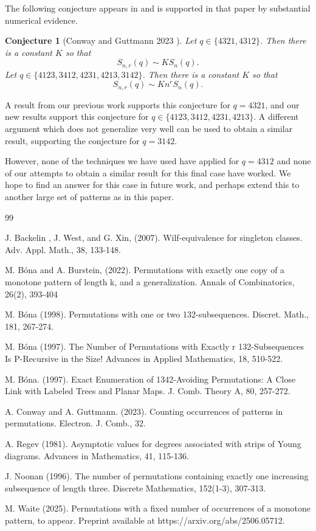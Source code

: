 \documentclass[11pt, final]{amsart}
\newtheorem{conjecture}[theorem]{Conjecture}
\theoremstyle{remark}
\numberwithin{equation}{section}
\begin{document}
The following conjecture appears in \cite{Conway} and is supported in that paper by substantial numerical evidence.

\begin{conjecture}[Conway and Guttmann 2023 \cite{Conway}]
     Let $q\in \{4321, 4312\}$. Then there is a constant $K$ so that
     \[
     S_{n,r}(q) \sim KS_{n}(q).
     \]
     Let $q\in \{4123, 3412, 4231, 4213, 3142\}$. Then there is a constant $K$ so that
     \[
     S_{n,r}(q) \sim Kn^rS_{n}(q).
     \]
\end{conjecture}

A result from our previous work \cite{Waite2025} supports this conjecture for $q = 4321$, and our new results support this conjecture for $q \in \{4123, 3412, 4231, 4213 \}$. A different argument which does not generalize very well can be used to obtain a similar result, supporting the conjecture for $q = 3142$. 

However, none of the techniques we have used have applied for $q = 4312$ and none of our attempts to obtain a similar result for this final case have worked. We hope to find an answer for this case in  future work, and perhaps extend this to another large set of patterns as in this paper.

\begin{thebibliography}{99}

 J. Backelin , J. West, and G. Xin, (2007). Wilf-equivalence for singleton classes. Adv. Appl. Math., 38, 133-148.

  M. Bóna and A. Burstein,  (2022). Permutations with exactly one copy of a monotone pattern of length k, and a generalization. Annals of Combinatorics, 26(2), 393-404

 M. Bóna (1998). Permutations with one or two 132-subsequences. Discret. Math., 181, 267-274.

 M. Bóna (1997). The Number of Permutations with Exactly r 132-Subsequences Is P-Recursive in the Size! Advances in Applied Mathematics, 18, 510-522.

 M. Bóna. (1997). Exact Enumeration of 1342-Avoiding Permutations: A Close Link with Labeled Trees and Planar Maps. J. Comb. Theory A, 80, 257-272.

 A. Conway and A. Guttmann. (2023). Counting occurrences of patterns in permutations. Electron. J. Comb., 32.

 A. Regev (1981). Asymptotic values for degrees associated with strips of Young diagrams. Advances in Mathematics, 41, 115-136.

 J. Noonan (1996). The number of permutations containing exactly one increasing subsequence of length three. Discrete Mathematics, 152(1-3), 307-313.

 M. Waite (2025). Permutations with a fixed number of occurrences of a monotone pattern, to appear. Preprint available at https://arxiv.org/abs/2506.05712.



\end{thebibliography}
\end{document}
